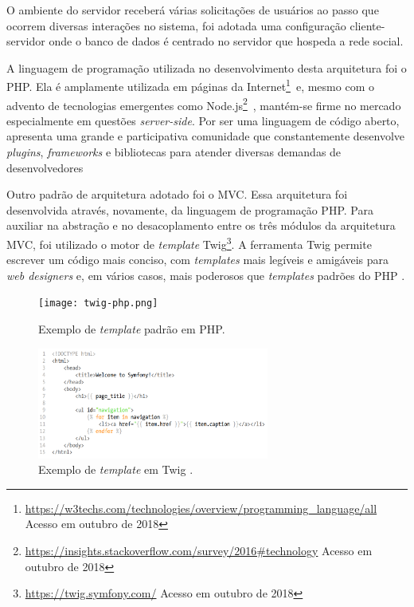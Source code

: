 O ambiente do servidor receberá várias solicitações de usuários ao passo que ocorrem diversas interações no sistema, foi adotada uma configuração cliente-servidor onde o banco de dados é centrado no servidor que hospeda a rede social.

A linguagem de programação utilizada no desenvolvimento desta arquitetura foi o PHP. Ela é amplamente utilizada em páginas da Internet\footnote{\url{https://w3techs.com/technologies/overview/programming_language/all} Acesso em outubro de 2018}~e, mesmo com o advento de tecnologias emergentes como Node.js\footnote{\url{https://insights.stackoverflow.com/survey/2016\#technology} Acesso em outubro de 2018}~, mantém-se firme no mercado especialmente em questões \textit{server-side}. Por ser uma linguagem de código aberto, apresenta uma grande e participativa comunidade que constantemente desenvolve \textit{plugins}, \textit{frameworks} e bibliotecas para atender diversas demandas de desenvolvedores \cite{phpPatternsArticle2016}

Outro padrão de arquitetura adotado foi o MVC. Essa arquitetura foi desenvolvida através, novamente, da linguagem de programação PHP. Para auxiliar na abstração e no desacoplamento entre os três módulos da arquitetura MVC, foi utilizado o motor de \textit{template} Twig\footnote{\url{https://twig.symfony.com/} Acesso em outubro de 2018}. A ferramenta Twig  permite escrever um código mais conciso, com \textit{templates} mais legíveis e amigáveis para \textit{web designers} e, em vários casos, mais poderosos que \textit{templates} padrões do PHP \cite{symfonyBook}.

\begin{figure}[ht]
    \caption{Exemplo de \textit{template} padrão em PHP.}
        \begin{center}
            \texttt{[image: twig-php.png]}
        \end{center}
    \label{codeTemplatePHP}
\end{figure}

\bigskip

\begin{figure}[ht]
    \caption{Exemplo de \textit{template} em Twig .}
        \begin{center}
            \includegraphics[width=0.68\textwidth]{figuras/twig-symf.png}
        \end{center}
    \label{codeTemplateTwig}
\end{figure}


